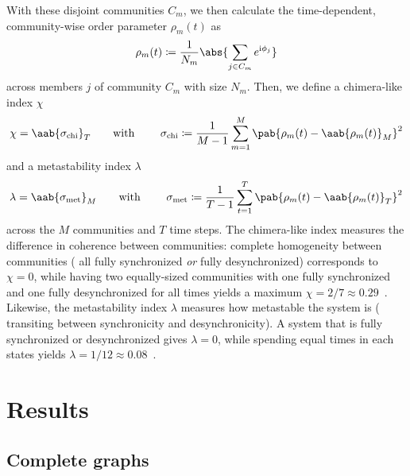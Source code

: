 \documentclass[pdflatex,lineno,referee,sn-mathphys-ay]{sn-jnl}
\begin{document}
With these disjoint communities $C_m$, we then calculate
the time-dependent, community-wise order parameter $\rho_m(t)$
as
\begin{equation}
  \rho_m(t) \coloneqq \frac{1}{N_m} \abs{\sum_{j \in C_m} e^{\im \phi_j}}
\end{equation}
across members $j$ of community $C_m$ with size $N_m$.
Then, we define a chimera-like index $\chi$
\begin{equation}
  \chi = \aab{
    \sigma_{\text{chi}}}_T
    \text{\qquad with \qquad}
    \sigma_{\text{chi}} \coloneqq \frac{1}{M-1} \sum_{m=1}^M
    \pab{\rho_m(t) - \aab{\rho_m(t)}_M}^2
  \label{eq:chimera_index}
\end{equation}
and a metastability index $\lambda$
\begin{equation}
  \lambda = \aab{
    \sigma_{\text{met}}}_M
    \text{\qquad with \qquad}
    \sigma_{\text{met}} \coloneqq \frac{1}{T-1} \sum_{t=1}^T
    \pab{\rho_m(t) - \aab{\rho_m(t)}_T}^2
  \label{eq:metastability_index}
\end{equation}
across the $M$ communities and $T$ time steps.
The chimera-like index measures the difference in coherence between communities:
complete homogeneity between communities
(\eg{} all fully synchronized \emph{or} fully desynchronized)
corresponds to $\chi = 0$,
while having two equally-sized communities
with one fully synchronized and one fully desynchronized
for all times yields a maximum $\chi = 2/7 \approx
\num{0.29}$~\citep{shanahan2010metastable}.
Likewise, the metastability index $\lambda$ measures how metastable
the system is (\ie{} transiting between synchronicity and desynchronicity).
A system that is fully synchronized or desynchronized gives $\lambda = 0$,
while spending equal times in each states yields $\lambda = 1/12
\approx \num{0.08}$~\citep{shanahan2010metastable}.

\section{Results}
\label{sec:results}
\subsection{Complete graphs}
\label{sec:complete_graph}
\end{document}
